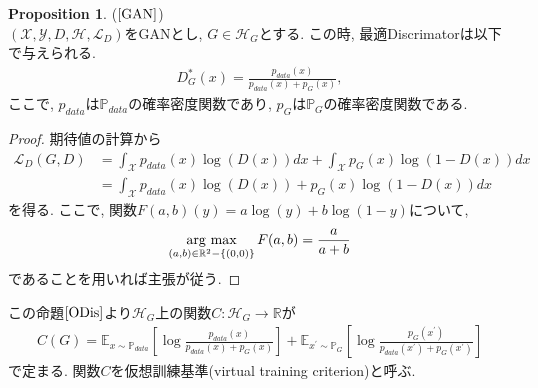 \documentclass[11pt, a4paper, dvipdfmx]{jsarticle}
\theoremstyle{definition}
\newtheorem{Proposition+}[Axiom+]{Proposition}
\newcommand{\R}{\mathbb{R}}
\newcommand{\X}{\mathcal{X}}
\newcommand{\Y}{\mathcal{Y}}
\newcommand{\Hil}{\mathcal{H}}
\newcommand{\Loss}{\mathcal{L}_{D}}
\newcommand{\MLsp}{(\X, \Y, D, \Hil, \Loss)}
\newcommand{\argmax}{\mathop{\rm arg~max}\limits}
\begin{document}
\begin{Proposition+}($\cite{GAN}$)\label{ODis}\\
    $\MLsp$をGANとし, $G\in\Hil_{G}$とする. この時, 最適Discrimatorは以下で与えられる.
    \begin{align*}
        D_{G}^{*}(x) = \frac{p_{data}(x)}{p_{data}(x) + p_{G}(x)},
    \end{align*}
    ここで, $p_{data}$は$\mathbb{P}_{data}$の確率密度関数であり, $p_{G}$は$\mathbb{P}_{G}$の確率密度関数である.
\begin{proof}
    期待値の計算から
    \begin{align*}
        \Loss(G, D) &= \int_{\X}p_{data}(x)\log(D(x))dx + \int_{\X}p_{G}(x)\log(1 - D(x))dx\\
                    &= \int_{\X}p_{data}(x)\log(D(x)) + p_{G}(x)\log(1 - D(x))dx
    \end{align*}
    を得る. ここで, 関数$F(a, b)(y) = a\log(y) + b\log(1 - y)$について, 
    \begin{align*}
        \argmax_{(a, b)\in\R^{2}- \{(0, 0)\}}F(a, b)= \frac{a}{a + b}
    \end{align*}
    であることを用いれば主張が従う.
\end{proof}
\end{Proposition+}
この命題$\ref{ODis}$より$\Hil_{G}$上の関数$C:\Hil_{G}\to\R$が
\begin{align*}
    C(G) = \mathbb{E}_{x\sim\mathbb{P}_{data}}\left[ \log\frac{p_{data}(x)}{p_{data}(x) + p_{G}(x)} \right] + \mathbb{E}_{x^{\prime}\sim\mathbb{P}_{G}}\left[ \log\frac{p_{G}(x^{\prime})}{p_{data}(x^{\prime}) + p_{G}(x^{\prime})} \right]
\end{align*}
で定まる. 関数$C$を仮想訓練基準(virtual training criterion)と呼ぶ. 
\end{document}
